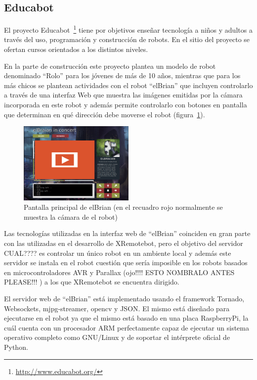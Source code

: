 
\subsection{Educabot}
El proyecto Educabot~\footnote{\url{http://www.educabot.org/}} tiene por
objetivos enseñar tecnología a niños y adultos a través
del uso, programación y construcción de robots. En el sitio del proyecto
se ofertan cursos orientados a los distintos niveles.


En la parte de construcción este proyecto plantea un modelo de robot denominado
``Rolo'' para los jóvenes de más de 10 años, mientras que para los más chicos
se plantean actividades con el robot ``elBrian'' que incluyen
controlarlo a través de una interfaz Web que muestra las imágenes emitidas
por la cámara incorporada en este robot y además permite controlarlo con
botones en pantalla que determinan en qué dirección debe moverse el robot
(figura~\ref{fig:elbrian}).

\begin{figure}
    \centering
    \includegraphics[width=0.5\textwidth]{figures/elbrian-1}
    \caption{Pantalla principal de elBrian (en el recuadro rojo normalmente
        se muestra la cámara de el robot)}
    \label{fig:elbrian}
\end{figure}

Las tecnologías utilizadas en la interfaz web de ``elBrian'' coinciden en gran
parte con las utilizadas en el desarrollo de XRemotebot, pero el objetivo del
servidor CUAL???? es controlar un único robot en un ambiente local y además este servidor
se instala en el robot cuestión que sería imposible en los robots basados en
microcontroladores AVR y Parallax (ojo!!!!  ESTO NOMBRALO ANTES PLEASE!!! ) a los que XRemotebot se encuentra dirigido.


El servidor web de ``elBrian'' está implementado usando el framework Tornado,
Websockets, mjpg-streamer, opencv y JSON. El mismo está diseñado para ejecutarse
en el robot ya que el mismo está basado en una placa RaspberryPi, la cuál
cuenta con un procesador ARM perfectamente capaz de ejecutar un sistema
operativo completo como GNU/Linux y de soportar el intérprete oficial de Python.

